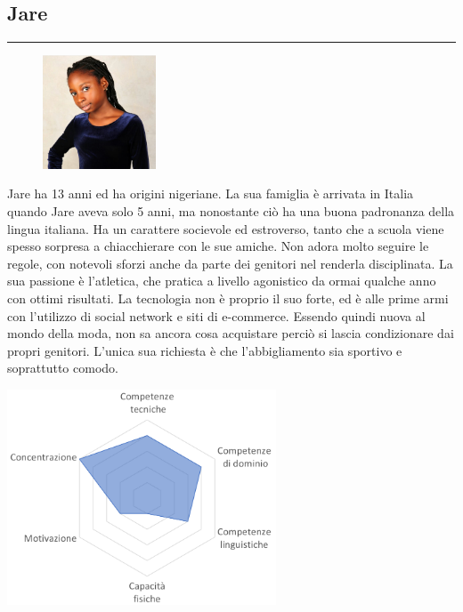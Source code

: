 \documentclass[12pt,a4paper]{report}
\begin{document}
\subsection*{Jare}
\rule{\textwidth}{0.5pt}
\begin{figure}
  \centering
    \includegraphics[width=0.3\textwidth]{"Images Latex/Personas/Jare"}
\end{figure}
Jare ha 13 anni ed ha origini nigeriane. La sua famiglia è arrivata in Italia quando Jare aveva solo 5 anni, ma nonostante ciò ha una buona padronanza della lingua italiana. Ha un carattere socievole ed estroverso, tanto che a scuola viene spesso sorpresa a chiacchierare con le sue amiche. Non adora molto seguire le regole, con notevoli sforzi anche da parte dei genitori nel renderla disciplinata. La sua passione è l'atletica, che pratica a livello agonistico da ormai qualche anno con ottimi risultati. La tecnologia non è proprio il suo forte, ed è alle prime armi con l'utilizzo di social network e siti di e-commerce. Essendo quindi nuova al mondo della moda, non sa ancora cosa acquistare perciò si lascia condizionare dai propri genitori. L'unica sua richiesta è che l'abbigliamento sia sportivo e soprattutto comodo.
\begin{center}
  \includegraphics[width=0.6\textwidth]{"Images Latex/Personas/Jare13"}
\end{center}
\newpage
\end{document}
